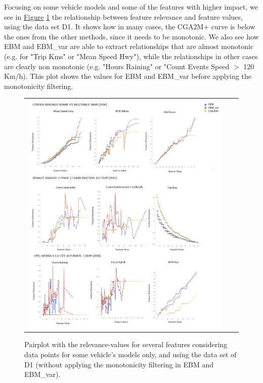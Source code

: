 Focusing on some vehicle models and some of the features with higher impact, we see in \hyperref[fig:ch6-PairplotComparison]{Figure} \ref{fig:ch6-PairplotComparison} the relationship between feature relevance and feature values, using the data set D1. It shows how in many cases, the CGA2M+ curve is below the ones from the other methods, since it needs to be monotonic. We also see how EBM and EBM\_var are able to extract relationships that are almost monotonic (e.g. for "Trip Kms" or "Mean Speed Hwy"), while the relationships in other cases are clearly non monotonic (e.g. "Hours Raining" or "Count Events Speed $>$ 120 Km/h). This plot shows the values for EBM and EBM\_var before applying the monotonicity filtering.

\begin{figure}
\centering
\begin{tabular}{c@{\qquad}c@{\qquad}c}
\includegraphics[width=\textwidth]{figures/chapter6_LucaFleet/PairplotComparison.jpg}
  \end{tabular} 
  \caption{Pairplot with the relevance-values for several features considering data points for some vehicle's models only, and using the data set of D1 (without applying the monotonicity filtering in EBM and EBM\_var).\label{fig:ch6-PairplotComparison}}
\end{figure}

